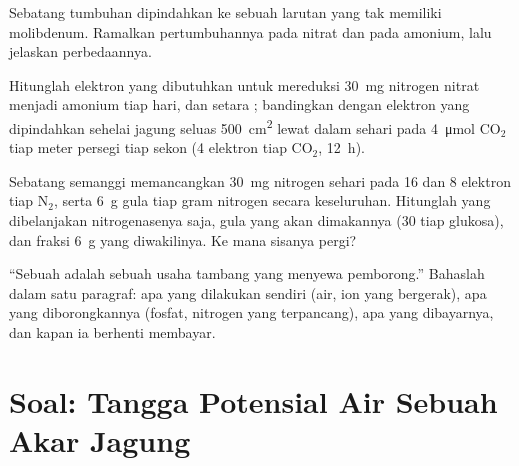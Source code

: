 \begin{exercise}[$\star\star$]\label{exo:b1:plant-water-minerals:9}
Sebatang tumbuhan dipindahkan ke sebuah larutan yang tak memiliki
molibdenum. Ramalkan pertumbuhannya pada nitrat dan pada amonium, lalu
jelaskan perbedaannya.
\end{exercise}

\begin{exercise}[$\star\star\star$]\label{exo:b1:plant-water-minerals:10}
Hitunglah elektron yang dibutuhkan untuk mereduksi \qty{30}{mg}
nitrogen nitrat menjadi amonium tiap hari, dan setara ;
bandingkan dengan elektron yang dipindahkan sehelai  jagung seluas
\qty{500}{cm^2} lewat  dalam sehari pada
\qty{4}{\micro mol} $\mathrm{CO_2}$ tiap meter persegi tiap sekon (4
elektron tiap $\mathrm{CO_2}$, \qty{12}{h}).
\end{exercise}

\begin{exercise}[$\star\star\star$]\label{exo:b1:plant-water-minerals:11}
Sebatang semanggi memancangkan \qty{30}{mg} nitrogen sehari pada
\qty{16}{}  dan \qty{8}{} elektron tiap $\mathrm{N_2}$, serta
\qty{6}{g} gula tiap gram nitrogen secara keseluruhan. Hitunglah 
yang dibelanjakan nitrogenasenya saja, gula yang akan dimakannya (30
 tiap glukosa), dan fraksi \qty{6}{g} yang diwakilinya. Ke mana
sisanya pergi?
\end{exercise}

\begin{exercise}[$\star\star\star$]\label{exo:b1:plant-water-minerals:12}
``Sebuah  adalah sebuah usaha tambang yang menyewa pemborong.''
Bahaslah dalam satu paragraf: apa yang dilakukan  sendiri (air,
ion yang bergerak), apa yang diborongkannya (fosfat, nitrogen yang
terpancang), apa yang dibayarnya, dan kapan ia berhenti membayar.
\end{exercise}

\section{Soal: Tangga Potensial Air Sebuah Akar Jagung}

